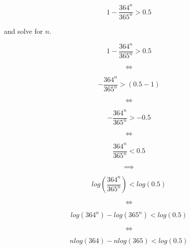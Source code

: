 \documentclass[a4paper,11pt]{article}
\begin{document}
\begin{equation}
  1 - \frac{364^{n}}{365^{n}} > 0.5
\end{equation}

and solve for $n$.

\begin{equation}
  1 - \frac{364^{n}}{365^{n}} > 0.5
\end{equation}

\begin{equation}
\iff
\end{equation}

\begin{equation}
  - \frac{364^{n}}{365^{n}} > \left( 0.5 -1 \right)
\end{equation}


\begin{equation}
\iff
\end{equation}

\begin{equation}
  - \frac{364^{n}}{365^{n}} > - 0.5
\end{equation}


\begin{equation}
\iff
\end{equation}

\begin{equation}
   \frac{364^{n}}{365^{n}} <  0.5
\end{equation}

\begin{equation}
\implies
\end{equation}

\begin{equation}
   log\left( \frac{364^{n}}{365^{n}} \right) <  log \left( 0.5 \right)
\end{equation}

\begin{equation}
\iff
\end{equation}

\begin{equation}
   log\left( 364^{n} \right) - log\left(365^{n} \right) <  
    log \left( 0.5 \right)
\end{equation}

\begin{equation}
\iff
\end{equation}

\begin{equation}
   n log\left( 364 \right) - n log\left(365 \right) <  
    log \left( 0.5 \right)
\end{equation}
\end{document}
